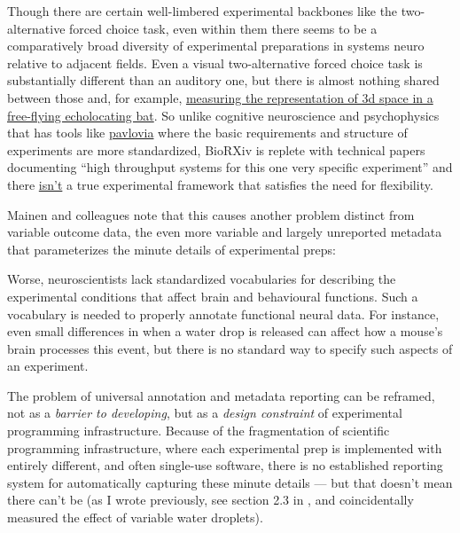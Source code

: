 \documentclass[11pt]{article}
\begin{document}
\begin{multicols}{2}
Though there are certain well-limbered experimental backbones like the
two-alternative forced choice task, even within them there seems to be a
comparatively broad diversity of experimental preparations in systems
neuro relative to adjacent fields. Even a visual two-alternative forced
choice task is substantially different than an auditory one, but there
is almost nothing shared between those and, for example,
\href{https://doi.org/10.7554/eLife.29053}{measuring the representation
of 3d space in a free-flying echolocating bat}. So unlike cognitive
neuroscience and psychophysics that has tools like
\href{https://pavlovia.org/}{pavlovia} where the basic requirements and
structure of experiments are more standardized, BioRXiv is replete with
technical papers documenting ``high throughput systems for this one very
specific experiment'' and there
\href{https://docs.auto-pi-lot.com}{isn't} a true experimental framework
that satisfies the need for flexibility.

Mainen and colleagues note that this causes another problem distinct
from variable outcome data, the even more variable and largely
unreported metadata that parameterizes the minute details of
experimental preps:

\begin{leftbar}
Worse, neuroscientists lack standardized vocabularies for describing the
experimental conditions that affect brain and behavioural functions.
Such a vocabulary is needed to properly annotate functional neural data.
For instance, even small differences in when a water drop is released
can affect how a mouse's brain processes this event, but there is no
standard way to specify such aspects of an experiment. \cite{mainenBetterWayCrack2016} 
\end{leftbar}

The problem of universal annotation and metadata reporting can be
reframed, not as a \emph{barrier to developing}, but as a \emph{design
constraint} of experimental programming infrastructure. Because of the
fragmentation of scientific programming infrastructure, where each
experimental prep is implemented with entirely different, and often
single-use software, there is no established reporting system for
automatically capturing these minute details --- but that doesn't mean
there can't be (as I wrote previously, see section 2.3 in \cite{saundersAutopilotAutomatingBehavioral2019} , and coincidentally
measured the effect of variable water droplets).

\hypertarget{the-hacker-spirit-and-celebration-of-heroism}{%
}
\end{multicols}
\end{document}
